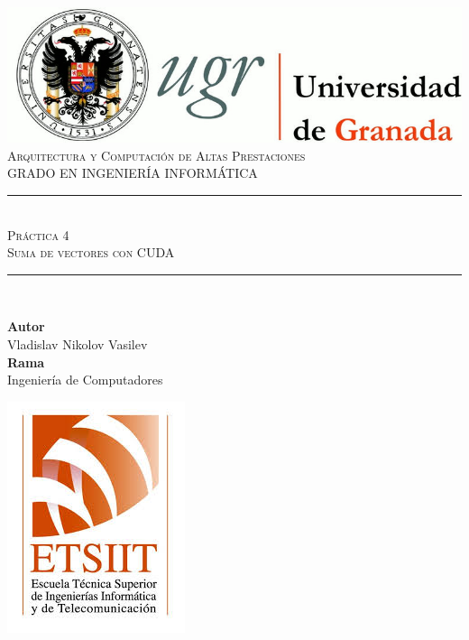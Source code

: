 \documentclass[11pt,a4paper]{article}
\newcommand{\asignatura}{Arquitectura y Computación de Altas Prestaciones}
\newcommand{\autor}{Vladislav Nikolov Vasilev}
\newcommand{\titulo}{Práctica 4}
\newcommand{\subtitulo}{Suma de vectores con CUDA}
\newcommand{\rama}{Ingeniería de Computadores}
\begin{document}

\begin{titlepage}

\begin{minipage}{\textwidth}

\centering

\includegraphics[scale=0.3]{img/logo_ugr.jpg}\\[1cm]

\textsc{\Large \asignatura{}\\[0.2cm]}
\textsc{GRADO EN INGENIERÍA INFORMÁTICA}\\[1cm]

\noindent\rule[-1ex]{\textwidth}{1pt}\\[1.5ex]
\textsc{{\Huge \titulo\\[0.5ex]}}
\textsc{{\Large \subtitulo\\}}
\noindent\rule[-1ex]{\textwidth}{2pt}\\[3.5ex]

\end{minipage}

\vspace{0.7cm}

\begin{minipage}{\textwidth}

\centering

\textbf{Autor}\\ {\autor{}}\\[2.5ex]
\textbf{Rama}\\ {\rama}\\[2.5ex]
\vspace{0.3cm}

\includegraphics[scale=0.3]{img/etsiit.jpeg}


\end{minipage}
\end{titlepage}
\end{document}
